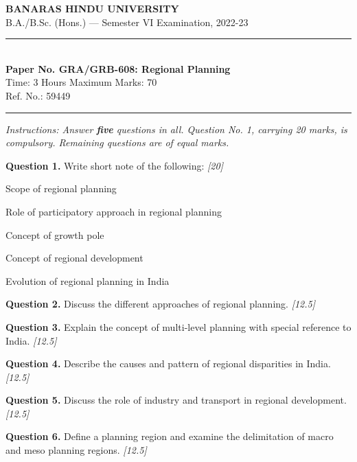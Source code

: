 \documentclass[11pt,a4paper]{article}
\newcommand{\pts}[1]{\hfill   \textit{[#1]}}
\begin{document}
\begin{center}
  {\large\bfseries BANARAS HINDU UNIVERSITY}\\[2pt]
  {\normalsize B.A./B.Sc. (Hons.) --- Semester VI Examination, 2022-23}\\[6pt]
  \rule{0.8\linewidth}{0.5pt}\\[6pt]
  {\large\bfseries Paper No. GRA/GRB-608: Regional Planning}\\[4pt]
  {\normalsize Time: 3 Hours \hfill Maximum Marks: 70}\\[2pt]
  {\small Ref. No.: 59449}
\end{center}
\rule{\linewidth}{0.4pt}
\smallskip



\noindent   \textit{Instructions: Answer   \textbf{five} questions in all. Question No. 1, carrying 20 marks, is compulsory. Remaining questions are of equal marks.}
\bigskip




\noindent   \textbf{Question 1.} Write short note of the following: \pts{20}

\begin{parts}
  \item Scope of regional planning
  \item Role of participatory approach in regional planning
  \item Concept of growth pole
  \item Concept of regional development
  \item Evolution of regional planning in India
\end{parts}

\medskip


\noindent   \textbf{Question 2.} Discuss the different approaches of regional planning. \pts{12.5}

\medskip


\noindent   \textbf{Question 3.} Explain the concept of multi-level planning with special reference to India. \pts{12.5}

\medskip


\noindent   \textbf{Question 4.} Describe the causes and pattern of regional disparities in India. \pts{12.5}

\medskip


\noindent   \textbf{Question 5.} Discuss the role of industry and transport in regional development. \pts{12.5}

\medskip


\noindent   \textbf{Question 6.} Define a planning region and examine the delimitation of macro and meso planning regions. \pts{12.5}
\end{document}
